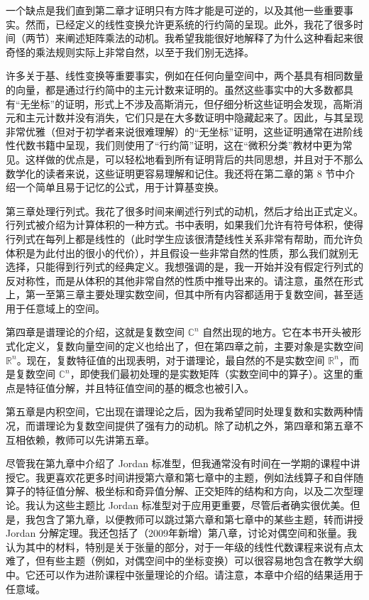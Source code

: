 \begin{preface}
一个缺点是我们直到第二章才证明只有方阵才能是可逆的，以及其他一些重要事实。然而，已经定义的线性变换允许更系统的行约简的呈现。此外，我花了很多时间（两节）来阐述矩阵乘法的动机。我希望我能很好地解释了为什么这种看起来很奇怪的乘法规则实际上非常自然，以至于我们别无选择。

许多关于基、线性变换等重要事实，例如在任何向量空间中，两个基具有相同数量的向量，都是通过行约简中的主元计数来证明的。虽然这些事实中的大多数都具有“无坐标”的证明，形式上不涉及高斯消元，但仔细分析这些证明会发现，高斯消元和主元计数并没有消失，它们只是在大多数证明中隐藏起来了。因此，与其呈现非常优雅（但对于初学者来说很难理解）的“无坐标”证明，这些证明通常在进阶线性代数书籍中呈现，我们则使用了“行约简”证明，这在“微积分类”教材中更为常见。这样做的优点是，可以轻松地看到所有证明背后的共同思想，并且对于不那么数学化的读者来说，这些证明更容易理解和记住。我还将在第二章的第 8 节中介绍一个简单且易于记忆的公式，用于计算基变换。

第三章处理行列式。我花了很多时间来阐述行列式的动机，然后才给出正式定义。行列式被介绍为计算体积的一种方式。书中表明，如果我们允许有符号体积，使得行列式在每列上都是线性的（此时学生应该很清楚线性关系非常有帮助，而允许负体积是为此付出的很小的代价），并且假设一些非常自然的性质，那么我们就别无选择，只能得到行列式的经典定义。我想强调的是，我一开始并没有假定行列式的反对称性，而是从体积的其他非常自然的性质中推导出来的。请注意，虽然在形式上，第一至第三章主要处理实数空间，但其中所有内容都适用于复数空间，甚至适用于任意域上的空间。

第四章是谱理论的介绍，这就是复数空间 $\mathbb{C}^n$ 自然出现的地方。它在本书开头被形式化定义，复数向量空间的定义也给出了，但在第四章之前，主要对象是实数空间 $\mathbb{R}^n$。现在，复数特征值的出现表明，对于谱理论，最自然的不是实数空间 $\mathbb{R}^n$，而是复数空间 $\mathbb{C}^n$，即使我们最初处理的是实数矩阵（实数空间中的算子）。这里的重点是特征值分解，并且特征值空间的基的概念也被引入。

第五章是内积空间，它出现在谱理论之后，因为我希望同时处理复数和实数两种情况，而谱理论为复数空间提供了强有力的动机。除了动机之外，第四章和第五章不互相依赖，教师可以先讲第五章。

尽管我在第九章中介绍了 Jordan 标准型，但我通常没有时间在一学期的课程中讲授它。我更喜欢花更多时间讲授第六章和第七章中的主题，例如法线算子和自伴随算子的特征值分解、极坐标和奇异值分解、正交矩阵的结构和方向，以及二次型理论。我认为这些主题比 Jordan 标准型对于应用更重要，尽管后者确实很优美。但是，我包含了第九章，以便教师可以跳过第六章和第七章中的某些主题，转而讲授 Jordan 分解定理。我还包括了（2009年新增）第八章，讨论对偶空间和张量。我认为其中的材料，特别是关于张量的部分，对于一年级的线性代数课程来说有点太难了，但有些主题（例如，对偶空间中的坐标变换）可以很容易地包含在教学大纲中。它还可以作为进阶课程中张量理论的介绍。请注意，本章中介绍的结果适用于任意域。


\end{preface}
